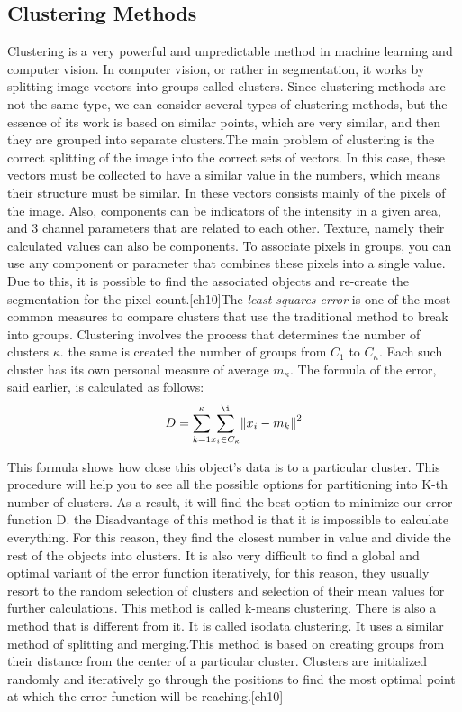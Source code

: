 \subsection{Clustering Methods}\label{sec:3.4.2}
\par Clustering is a very powerful and unpredictable method in machine learning and computer vision. In computer vision, or rather in segmentation, it works by splitting image vectors into groups called clusters. Since clustering methods are not the same type, we can consider several types of clustering methods, but the essence of its work is based on similar points, which are very similar, and then they are grouped into separate clusters.The main problem of clustering is the correct splitting of the image into the correct sets of vectors. In this case, these vectors must be collected to have a similar value in the numbers, which means their structure must be similar. In these vectors consists mainly of the pixels of the image. Also, components can be indicators of the intensity in a given area, and 3 channel parameters that are related to each other. Texture, namely their calculated values can also be components. To associate pixels in groups, you can use any component or parameter that combines these pixels into a single value. Due to this, it is possible to find the associated objects and re-create the segmentation for the pixel count.[ch10]The\textit{ least squares error} is one of the most common measures to compare clusters that use the traditional method to break into groups. Clustering involves the process that determines the number of clusters $\kappa$. the same is created the number of groups from $C_{1}$ to $C_{\kappa}$. Each such cluster has its own personal measure of average $m_{\kappa}$. The formula of the error, said earlier, is calculated as follows:
\begin{equation}
D = {\sum\limits_{k=1}^{\kappa}} {\sum\limits_{x_i \in{C_{\kappa}}}^{\i}}{\Vert x_i - m_k \Vert}^{2}
\end{equation}

\par This formula shows how close this object's data is to a particular cluster. This procedure will help you to see all the possible options for partitioning into K-th number of clusters. As a result, it will find the best option to minimize our error function D. the Disadvantage of this method is that it is impossible to calculate everything. For this reason, they find the closest number in value and divide the rest of the objects into clusters. It is also very difficult to find a global and optimal variant of the error function iteratively, for this reason, they usually resort to the random selection of clusters and selection of their mean values for further calculations. This method is called k-means clustering. There is also a method that is different from it. It is called isodata clustering. It uses a similar method of splitting and merging.This method is based on creating groups from their distance from the center of a particular cluster. Clusters are initialized randomly and iteratively go through the positions to find the most optimal point at which the error function will be reaching.[ch10]

